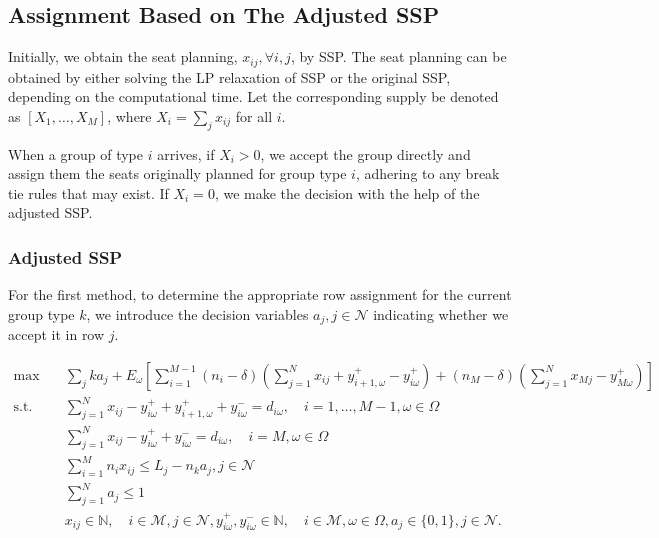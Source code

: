 
\subsection{Assignment Based on The Adjusted SSP}
Initially, we obtain the seat planning, $x_{ij}, \forall i,j$, by SSP. The seat planning can be obtained by either solving the LP relaxation of SSP or the original SSP, depending on the computational time. Let the corresponding supply be denoted as $[X_1, \ldots, X_M]$, where $X_i = \sum_{j} x_{ij}$ for all $i$.

When a group of type $i$ arrives, if $X_i > 0$, we accept the group directly and assign them the seats originally planned for group type $i$, adhering to any break tie rules that may exist. If $X_i = 0$, we make the decision with the help of the adjusted SSP. 

\subsubsection{Adjusted SSP}
For the first method, to determine the appropriate row assignment for the current group type $k$, we introduce the decision variables $a_j, j \in \mathcal{N}$ indicating whether we accept it in row $j$.

\begin{equation}\label{adjusted_SSP}
  \begin{aligned}
  \max \quad & \sum_{j} k a_j + E_{\omega}\left[\sum_{i=1}^{M-1} (n_i-\delta) (\sum_{j= 1}^{N} x_{ij} + y_{i+1,\omega}^{+} - y_{i \omega}^{+}) + (n_{M}-\delta) (\sum_{j= 1}^{N} x_{Mj} - y_{M \omega}^{+})\right] \\
  \text {s.t.} \quad & \sum_{j= 1}^{N} x_{ij}-y_{i \omega}^{+}+
  y_{i+1, \omega}^{+} + y_{i \omega}^{-}=d_{i \omega}, \quad i = 1,\ldots,M-1, \omega \in \Omega \\
  & \sum_{j= 1}^{N} x_{ij} -y_{i \omega}^{+}+y_{i \omega}^{-}=d_{i \omega}, \quad i = M, \omega \in \Omega \\
  & \sum_{i=1}^{M} n_{i} x_{ij} \leq L_j - n_k a_j, j \in \mathcal{N} \\
  & \sum_{j=1}^{N} a_j \leq 1 \\
  & x_{ij} \in \mathbb{N}, \quad i \in \mathcal{M}, j \in \mathcal{N}, y_{i \omega}^{+}, y_{i \omega}^{-} \in \mathbb{N}, \quad i \in \mathcal{M}, \omega \in \Omega,  a_j \in \{0,1\}, j \in \mathcal{N}.
  \end{aligned}
\end{equation}

